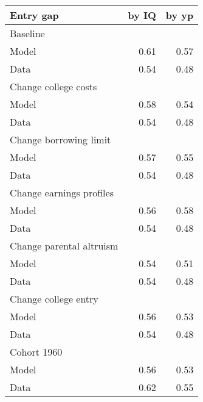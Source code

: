 \begin{tabular}{lrr}
\hline
Entry gap & by IQ  & by yp  \\ 
\hline
Baseline &   &   \\ 
Model & 0.61  & 0.57  \\ 
Data & 0.54  & 0.48  \\ 
Change college costs &   &   \\ 
Model & 0.58  & 0.54  \\ 
Data & 0.54  & 0.48  \\ 
Change borrowing limit &   &   \\ 
Model & 0.57  & 0.55  \\ 
Data & 0.54  & 0.48  \\ 
Change earnings profiles &   &   \\ 
Model & 0.56  & 0.58  \\ 
Data & 0.54  & 0.48  \\ 
Change parental altruism &   &   \\ 
Model & 0.54  & 0.51  \\ 
Data & 0.54  & 0.48  \\ 
Change college entry &   &   \\ 
Model & 0.56  & 0.53  \\ 
Data & 0.54  & 0.48  \\ 
Cohort 1960 &   &   \\ 
Model & 0.56  & 0.53  \\ 
Data & 0.62  & 0.55  \\ 
\hline
\end{tabular}%

